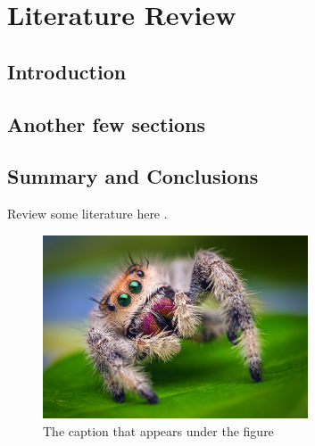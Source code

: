 \chapter{Literature Review}
\section{Introduction}
\lipsum[1]
\section{Another few sections}
\lipsum[1]
\section{Summary and Conclusions}
\lipsum[1]

Review some literature here \cite{StaceyThesis}.
\begin{figure}
	\centering
	\includegraphics[width=0.7\textwidth]{images/spidey}
	\vskip10pt
	\caption[The caption that appears in the list of figures]{The caption that appears under the figure}
	\label{fig:exam}
\end{figure}
\lipsum[1-5]